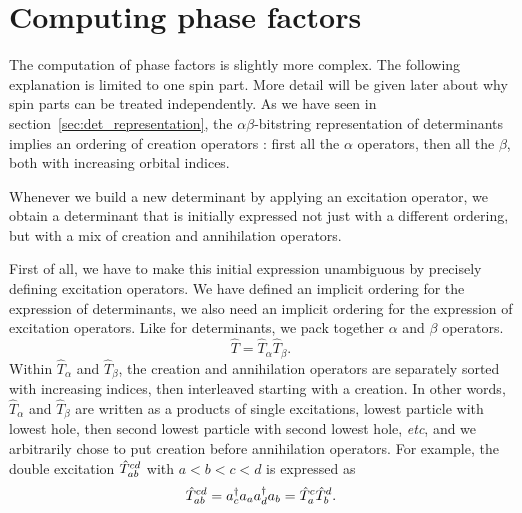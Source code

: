 \documentclass[./thesis.tex]{subfiles}
\begin{document}
\section{Computing phase factors}


The computation of phase factors is slightly more complex. The following explanation is limited to one spin part. More detail will be given later about why spin parts can be treated independently.
As we have seen in section~\ref{sec:det_representation}, the $\alpha \beta$-bitstring representation of determinants implies an ordering of creation operators : first all the $\alpha$ operators, then all the $\beta$, both with increasing orbital indices.

Whenever we build a new determinant by applying an excitation operator, we obtain a determinant that is initially expressed not just with a different ordering, but with a mix of creation and annihilation operators.

First of all, we have to make this initial expression unambiguous by precisely defining excitation operators. We have defined an implicit ordering for the expression of determinants, we also need an implicit ordering for the expression of excitation operators.
Like for determinants, we pack together $\alpha$ and $\beta$ operators.
\begin{equation}
\label{eq:spinpackexc}
\hat T = \hat T_\alpha \hat T_\beta.
\end{equation}
Within $\hat T_\alpha$ and $\hat T_\beta$, the creation and annihilation operators are separately sorted with increasing indices, then interleaved starting with a creation. In other words, $\hat T_\alpha$ and $\hat T_\beta$ are written as a products of single excitations, lowest particle with lowest hole, then second lowest particle with second lowest hole, \textit{etc}, and we arbitrarily chose to put creation before annihilation operators.
For example, the double excitation ${\hat{T}_{ab}^{cd}}$ with $a<b<c<d$ is expressed as
\begin{equation}
\hat T_{ab}^{cd} = a^\dagger_{c} a_{a} a^\dagger_{d} a_{b} = \hat T_a^c \hat T_b^d.
\end{equation}
\end{document}
